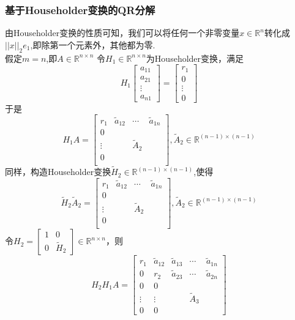 \documentclass[12pt,a4paper]{article}
\begin{document}
\subsubsection{基于Householder变换的QR分解}
由Householder变换的性质可知，我们可以将任何一个非零变量$x\in\mathbb{R}^{n}$转化成$||x||_{2}e_{1}$,即除第一个元素外，其他都为零.\\
假定$m=n$,即$A\in\mathbb{R}^{n\times n}$ 令$H_{1}\in\mathbb{R}^{n\times n}$为Householder变换，满足
$$
H_{1}\left[\begin{array}{c}{a_{11}} \\ {a_{21}} \\ {\vdots} \\ {a_{n 1}}\end{array}\right]=\left[\begin{array}{c}{r_{1}} \\ {0} \\ {\vdots} \\ {0}\end{array}\right]
$$
于是
$$
H_{1} A=\left[\begin{array}{c|ccc}
{r_{1}}&{\tilde{a}_{12}} &\cdots& {\tilde{a}_{1 n}} \\ \hline 
0& & & \\
\vdots&&{\tilde{A}_{2}}& \\
0& & &\\
\end{array}\right],\tilde{A}_{2} \in \mathbb{R}^{(n-1) \times(n-1)}
$$
同样，构造Householder变换$\tilde{H}_{2} \in \mathbb{R}^{(n-1) \times(n-1)}$,使得
$$
\tilde{H}_{2} \tilde{A}_{2}=\left[\begin{array}{c|ccc}
{r_{1}}&{\tilde{a}_{12}} &\cdots& {\tilde{a}_{1 n}} \\ \hline 
0& & & \\
\vdots&&{\tilde{A}_{2}}& \\
0& & &\\
\end{array}\right],\tilde{A}_{2} \in \mathbb{R}^{(n-1) \times(n-1)}
$$
令$H_{2}=\left[\begin{array}{cc}{1} & {0} \\ {0} & {\tilde{H}_{2}}\end{array}\right] \in \mathbb{R}^{n \times n}$，则
$$
H_{2} H_{1} A=
\left[\begin{array}{cc|ccc}
{r_{1}} & {\tilde{a}_{12}} & {\tilde{a}_{13}} & {\cdots} &{\tilde{a}_{1 n}} \\ 
{0} & {r_{2}} & {\tilde{a}_{23}}& {\cdots} & {\tilde{a}_{2 n}} \\ 
\hline 
0 & {0} &   &  &  \\
\vdots&\vdots& &{\tilde{A}_{3}}  & \\
{0} & {0} & {} & & \end{array}\right]
$$
\end{document}
